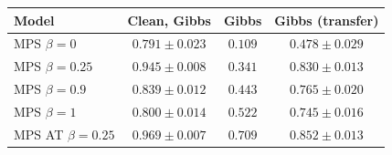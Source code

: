 \begin{tabular}{lccc}
\toprule
Model & Clean, Gibbs & Gibbs & Gibbs (transfer) \\
\midrule
MPS $\beta=0$ & $0.791 \pm 0.023$ & $0.109$ & $0.478 \pm 0.029$ \\
MPS $\beta=0.25$ & $0.945 \pm 0.008$ & $0.341$ & $0.830 \pm 0.013$ \\
MPS $\beta=0.9$ & $0.839 \pm 0.012$ & $0.443$ & $0.765 \pm 0.020$ \\
MPS $\beta=1$ & $0.800 \pm 0.014$ & $0.522$ & $0.745 \pm 0.016$ \\
MPS AT $\beta=0.25$ & $0.969 \pm 0.007$ & $\mathbf{0.709}$ & $0.852 \pm 0.013$ \\
\bottomrule
\end{tabular}
